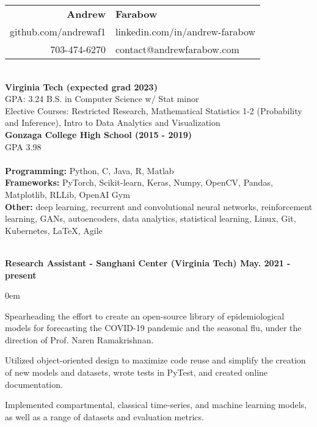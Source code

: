 \documentclass{article}
\begin{document}
\begin{center}
  \begin{tabular}{r l}
    {\huge\textbf{Andrew}}             & {\huge\textbf{Farabow}}        \\
    \hspace{35pt} github.com/andrewaf1 & linkedin.com/in/andrew-farabow \\
    703-474-6270                       & contact@andrewfarabow.com      \\
  \end{tabular}


  \begin{flushleft}
    \begin{multicols}{2}
      {\large\textbf{\underline{}}} \\
      \textbf{Virginia Tech (expected grad 2023)} \\
      GPA: 3.24 \; B.S. in Computer Science w/ Stat minor \\
      Elective Courses: Restricted Research, Mathematical Statistics 1-2 (Probability and Inference), Intro to Data Analytics and Visualization\\
      \textbf{Gonzaga College High School	(2015 - 2019)} \\
      GPA 3.98 \\


      \columnbreak
      {\large\textbf{\underline{}}} \\
      {\textbf{Programming:}} Python, C, Java, R, Matlab \\
      {\textbf{Frameworks:}} PyTorch, Scikit-learn, Keras, Numpy, OpenCV, Pandas, Matplotlib, RLLib, OpenAI Gym \\
      {\textbf{Other:}} deep learning, recurrent and convolutional neural networks, reinforcement learning, GANs, autoencoders, data analytics, statistical learning, Linux, Git, Kubernetes, LaTeX, Agile \\

    \end{multicols}

    {\large\textbf{\underline{}}} \\

    \textbf{Research Assistant - Sanghani Center (Virginia Tech) \hfill May. 2021 - present}
    \begin{compactitem}
      \itemsep0em
      \item Spearheading the effort to create an open-source library of epidemiological models for forecasting the COVID-19 pandemic and the seasonal flu, under the direction of Prof. Naren Ramakrishnan.
      \item Utilized object-oriented design to maximize code reuse and simplify the creation of new models and datasets, wrote tests in PyTest, and created online documentation.
      \item Implemented compartmental, classical time-series, and machine learning models, as well as a range of datasets and evaluation metrics.
    \end{compactitem}


\end{flushleft}
\end{center}
\end{document}
